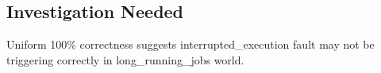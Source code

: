 \subsection{Investigation Needed}
Uniform 100\% correctness suggests interrupted\_execution fault may not be triggering correctly in long\_running\_jobs world.

